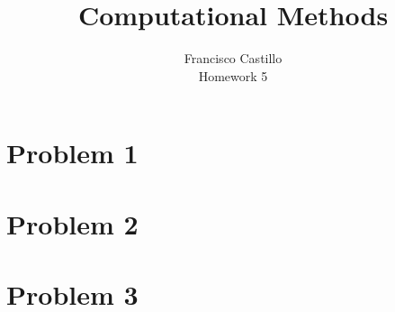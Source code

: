 \documentclass[12pt]{article}
\begin{document}
 
 
 
\title{Computational Methods}%
\author{Francisco Castillo\\Homework 5} %
 
\maketitle
\section*{Problem 1}

\newpage
\section*{Problem 2}

\newpage
\section*{Problem 3}




\end{document}
